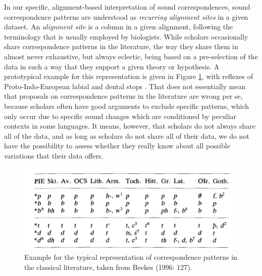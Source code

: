 \documentclass[xetex,svgnames]{scrartcl}
\begin{document}
In our specific, alignment-based interpretation of sound correspondences, sound correspondence
patterns are understood as \emph{recurring alignment sites} in a given dataset.  An \emph{alignment
site} is a column in a given alignment, following the terminology that is usually employed by
biologists. While scholars occasionally share correspondence patterns in the literature, the way
they share them in almost never exhaustive, but always eclectic, being based on a pre-selection of
the data in such a way that they support a given theory or hypothesis.
 A prototypical example for
this representation is given in Figure \ref{fig:beekes}, with reflexes of Proto-Indo-European labial
and dental stops \citep[127]{Beekes1996}.
That does not essentially
mean that proposals on correspondence patterns in the literature are wrong per se, because scholars
often have good arguments to exclude specific patterns, which only occur due to specific sound
changes which are conditioned by peculiar contexts in some languages. It means, however, that
scholars do not always share all of the data, and as long as scholars do not share all of their
data, we do not have the possibility to assess whether they really know about all possible
variations that their data offers.

\begin{figure}[htb]
  \centering
  \includegraphics[width=\textwidth]{beekes1996.png}
  \caption{Example for the typical representation of correspondence patterns in the classical
  literature, taken from Beekes (1996: 127).}
  \label{fig:beekes}
\end{figure}
\end{document}
